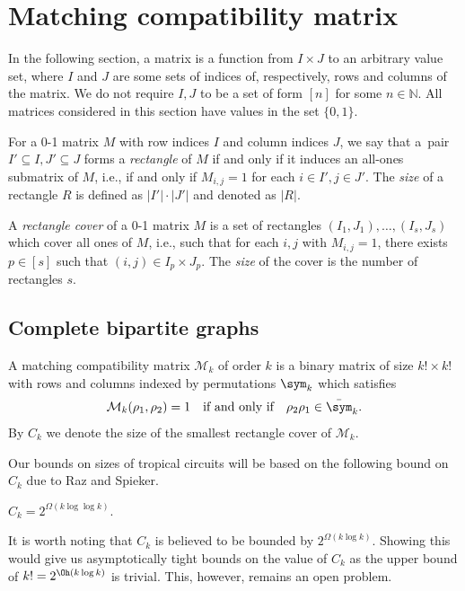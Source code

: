 \section{Matching compatibility matrix}
\label{sec:match}

In the following section, a matrix is a function from $I \times J$ to an arbitrary value set, where $I$ and $J$ are some sets of indices of, respectively, rows and columns of the matrix. We do not require $I, J$ to be a set of form $[n]$ for some $n \in \mathbb{N}$. All matrices considered in this section have values in the set $\{0, 1\}$.

\begin{definition}
    For a 0-1 matrix $M$ with row indices $I$ and column indices $J$, we say that a~pair $I' \subseteq I, J' \subseteq J$ forms a \emph{rectangle} of $M$ if and only if it induces an all-ones submatrix of $M$, i.e., if and only if $M_{i,j} = 1$ for each $i \in I', j \in J'$. The \emph{size} of a rectangle $R$ is defined as $|I'| \cdot |J'|$ and denoted as $|R|$.
\end{definition}

\begin{definition}
    A \emph{rectangle cover} of a 0-1 matrix $M$ is a set of rectangles $(I_1, J_1), \dots, (I_s, J_s)$ which cover all ones of $M$, i.e., such that for each $i,j$ with $M_{i,j} = 1$, there exists $p \in [s]$ such that $(i, j) \in I_p \times J_p$. The \emph{size} of the cover is the number of rectangles $s$.
\end{definition}

\subsection{Complete bipartite graphs}

\begin{definition}
    A matching compatibility matrix $\mathcal{M}_k$ of order $k$ is a binary matrix of size $k! \times k!$ with rows and columns indexed by permutations $\sym_k$ which satisfies
    $$
        \mathcal{M}_k(\rho_1, \rho_2) = 1 \quad \text{if and only if} \quad
        \rho_2 \rho_1 \in \bar\sym_k.
    $$
    By $C_k$ we denote the size of the smallest rectangle cover of $\mathcal{M}_k$.
\end{definition}

Our bounds on sizes of tropical circuits will be based on the following bound on $C_k$ due to Raz and Spieker.
\begin{lemma}\label{lem:raz_spieker}
    $C_k = 2^{\Omega(k \log \log k)}$.
\end{lemma}
It is worth noting that $C_k$ is believed to be bounded by $2^{\Omega(k \log k)}$. Showing this would give us asymptotically tight bounds on the value of $C_k$ as the upper bound of $k! = 2^{\Oh(k \log k)}$ is trivial. This, however, remains an open problem.

